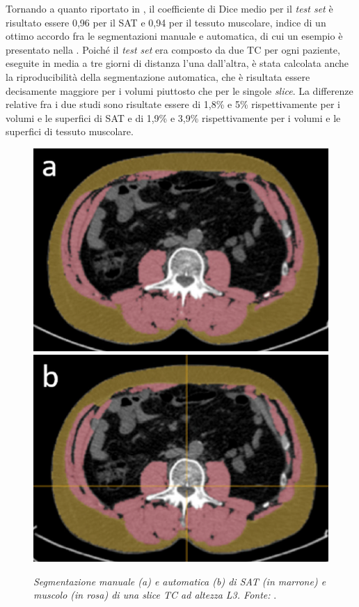 Tornando a quanto riportato in \cite{Borrelli2021}, il coefficiente di Dice medio per il \textit{test set} è risultato essere 0,96 per il SAT e 0,94 per il tessuto muscolare, indice di un ottimo accordo fra le segmentazioni manuale e automatica, di cui un esempio è presentato nella . Poiché il \textit{test set} era composto da due TC per ogni paziente, eseguite in media a tre giorni di distanza l’una dall'altra, è stata calcolata anche la riproducibilità della segmentazione automatica, che è risultata essere decisamente maggiore per i volumi piuttosto che per le singole \textit{slice}. La differenze relative fra i due studi sono risultate essere di 1,8\% e 5\% rispettivamente per i volumi e le superfici di SAT e di 1,9\% e 3,9\% rispettivamente per i volumi e le superfici di tessuto muscolare.
\begin{figure}[htp]
\centering
\includegraphics[scale=0.806]{Immagini/borrelli_manual.png}\quad\includegraphics[scale=0.791]{Immagini/borrelli_ai.png}
\caption{\label{fig:borrelli_segmentazione} \textit{Segmentazione manuale (a) e automatica (b) di SAT (in marrone) e muscolo (in rosa) di una slice TC ad altezza L3. Fonte:} \cite{Borrelli2021}.}
\end{figure}

